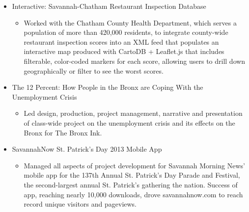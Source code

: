 \documentclass{article}
\begin{document}
\begin{itemize}[noitemsep,topsep=\mdcompacttopsep]%

\item{}Interactive: Savannah-Chatham Restaurant Inspection Database

\begin{itemize}[noitemsep,topsep=\mdcompacttopsep]%

\item{}Worked with the Chatham County Health Department, which serves a population of more than 420,000 residents, to integrate county-wide restaurant inspection scores into an XML feed that populates an interactive map produced with CartoDB + Leaflet.js that includes filterable, color-coded markers for each score, allowing users to drill down geographically or filter to see the worst scores.%
\end{itemize}%

\item{}The 12 Percent: How People in the Bronx are Coping With the Unemployment Crisis

\begin{itemize}[noitemsep,topsep=\mdcompacttopsep]%

\item{}Led design, production, project management, narrative and presentation of class-wide project on the unemployment crisis and its effects on the Bronx for The Bronx Ink.%
\end{itemize}%

\item{}SavannahNow St. Patrick's Day 2013 Mobile App

\begin{itemize}[noitemsep,topsep=\mdcompacttopsep]%

\item{}Managed all aspects of project development for Savannah Morning News' mobile app for the 137th Annual St. Patrick's Day Parade and Festival, the second-largest annual St. Patrick's gathering the nation. Success of app, reaching nearly 10,000 downloads, drove savannahnow.com to reach record unique visitors and pageviews.%
\end{itemize}%


\end{itemize}
\end{document}
